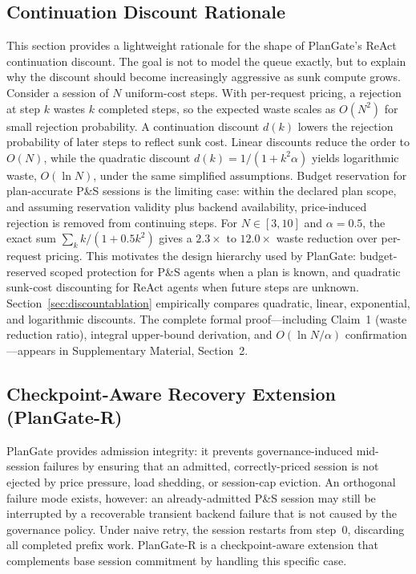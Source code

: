 \documentclass[sigconf,review,anonymous]{acmart}
\begin{document}
\subsection{Continuation Discount Rationale}
\label{sec:discount-rationale}

This section provides a lightweight rationale for the shape of PlanGate's ReAct continuation discount. The goal is not to model the queue exactly, but to explain why the discount should become increasingly aggressive as sunk compute grows. Consider a session of $N$ uniform-cost steps. With per-request pricing, a rejection at step $k$ wastes $k$ completed steps, so the expected waste scales as $O(N^2)$ for small rejection probability. A continuation discount $d(k)$ lowers the rejection probability of later steps to reflect sunk cost. Linear discounts reduce the order to $O(N)$, while the quadratic discount $d(k)=1/(1+k^2\alpha)$ yields logarithmic waste, $O(\ln N)$, under the same simplified assumptions. Budget reservation for plan-accurate P\&S sessions is the limiting case: within the declared plan scope, and assuming reservation validity plus backend availability, price-induced rejection is removed from continuing steps.
For $N\in[3,10]$ and $\alpha{=}0.5$, the exact sum $\sum_k k/(1+0.5k^2)$ gives a $2.3\times$ to $12.0\times$ waste reduction over per-request pricing. This motivates the design hierarchy used by PlanGate: budget-reserved scoped protection for P\&S agents when a plan is known, and quadratic sunk-cost discounting for ReAct agents when future steps are unknown. Section~\ref{sec:discountablation} empirically compares quadratic, linear, exponential, and logarithmic discounts. The complete formal proof---including Claim~1 (waste reduction ratio), integral upper-bound derivation, and $O(\ln N/\alpha)$ confirmation---appears in Supplementary Material, Section~2.

\subsection{Checkpoint-Aware Recovery Extension (PlanGate-R)}
\label{sec:recovery-ext}

PlanGate provides admission integrity: it prevents governance-induced mid-session failures by ensuring that an admitted, correctly-priced session is not ejected by price pressure, load shedding, or session-cap eviction.
An orthogonal failure mode exists, however: an already-admitted P\&S session may still be interrupted by a recoverable transient backend failure that is not caused by the governance policy.
Under naive retry, the session restarts from step~0, discarding all completed prefix work.
PlanGate-R is a checkpoint-aware extension that complements base session commitment by handling this specific case.
\end{document}
